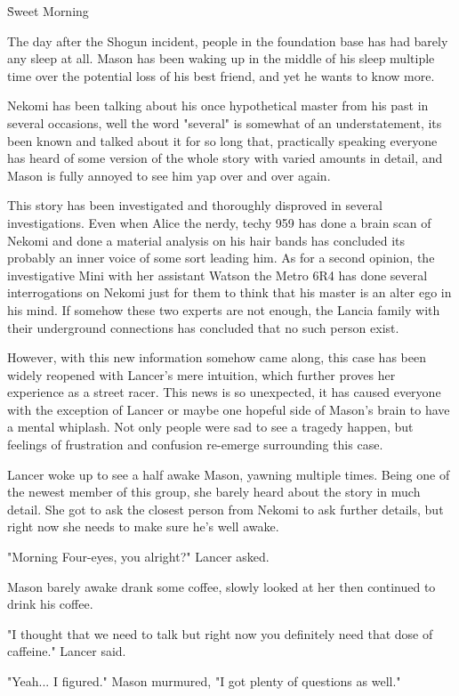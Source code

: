 \h {Sweet Morning}

The day after the Shogun incident, people in the foundation base has had barely any sleep at all. Mason has been waking up in the middle of his sleep multiple time over the potential loss of his best friend, and yet he wants to know more. 

Nekomi has been talking about his once hypothetical master from his past in several occasions, well the word "several" is somewhat of an understatement, its been known and talked about it for so long that, practically speaking everyone has heard of some version of the whole story with varied amounts in detail, and Mason is fully annoyed to see him yap over and over again. 

This story has been investigated and thoroughly disproved in several investigations. Even when Alice the nerdy, techy 959 has done a brain scan of Nekomi and done a material analysis on his hair bands has concluded its probably an inner voice of some sort leading him. As for a second opinion, the investigative Mini with her assistant Watson the Metro 6R4 has done several interrogations on Nekomi just for them to think that his master is an alter ego in his mind. If somehow these two experts are not enough, the Lancia family with their underground connections has concluded that no such person exist. 

However, with this new information somehow came along, this case has been widely reopened with Lancer's mere intuition, which further proves her experience as a street racer. This news is so unexpected, it has caused everyone with the exception of Lancer or maybe one hopeful side of Mason's brain to have a mental whiplash. Not only people were sad to see a tragedy happen, but feelings of frustration and confusion re-emerge surrounding this case.

Lancer woke up to see a half awake Mason, yawning multiple times. Being one of the newest member of this group, she barely heard about the story in much detail. She got to ask the closest person from Nekomi to ask further details, but right now she needs to make sure he's well awake. 

"Morning Four-eyes, you alright?" Lancer asked.

Mason barely awake drank some coffee, slowly looked at her then continued to drink his coffee. 

"I thought that we need to talk but right now you definitely need that dose of caffeine." Lancer said. 

"Yeah... I figured." Mason murmured, "I got plenty of questions as well."

